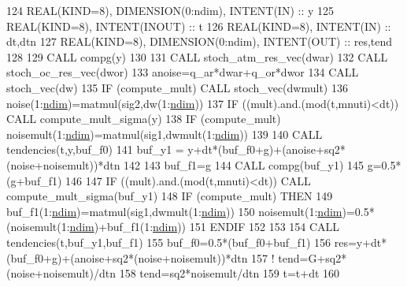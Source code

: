 \begin{DoxyCode}
124     \textcolor{keywordtype}{REAL(KIND=8)}, \textcolor{keywordtype}{DIMENSION(0:ndim)}, \textcolor{keywordtype}{INTENT(IN)} :: y
125     \textcolor{keywordtype}{REAL(KIND=8)}, \textcolor{keywordtype}{INTENT(INOUT)} :: t
126     \textcolor{keywordtype}{REAL(KIND=8)}, \textcolor{keywordtype}{INTENT(IN)} :: dt,dtn
127     \textcolor{keywordtype}{REAL(KIND=8)}, \textcolor{keywordtype}{DIMENSION(0:ndim)}, \textcolor{keywordtype}{INTENT(OUT)} :: res,tend
128 
129     \textcolor{keyword}{CALL }compg(y)
130     
131     \textcolor{keyword}{CALL }stoch\_atm\_res\_vec(dwar)
132     \textcolor{keyword}{CALL }stoch\_oc\_res\_vec(dwor)
133     anoise=q\_ar*dwar+q\_or*dwor
134     \textcolor{keyword}{CALL }stoch\_vec(dw)
135     \textcolor{keywordflow}{IF} (compute\_mult) \textcolor{keyword}{CALL }stoch\_vec(dwmult)
136     noise(1:\hyperlink{namespaceparams_a2323fe1773f086e20c14f266351c482b}{ndim})=matmul(sig2,dw(1:\hyperlink{namespaceparams_a2323fe1773f086e20c14f266351c482b}{ndim}))
137     \textcolor{keywordflow}{IF} ((mult).and.(mod(t,mnuti)<dt)) \textcolor{keyword}{CALL }compute\_mult\_sigma(y)
138     \textcolor{keywordflow}{IF} (compute\_mult) noisemult(1:\hyperlink{namespaceparams_a2323fe1773f086e20c14f266351c482b}{ndim})=matmul(sig1,dwmult(1:\hyperlink{namespaceparams_a2323fe1773f086e20c14f266351c482b}{ndim}))
139 
140     \textcolor{keyword}{CALL }tendencies(t,y,buf\_f0)
141     buf\_y1 = y+dt*(buf\_f0+g)+(anoise+sq2*(noise+noisemult))*dtn
142 
143     buf\_f1=g
144     \textcolor{keyword}{CALL }compg(buf\_y1)
145     g=0.5*(g+buf\_f1)
146     
147     \textcolor{keywordflow}{IF} ((mult).and.(mod(t,mnuti)<dt)) \textcolor{keyword}{CALL }compute\_mult\_sigma(buf\_y1)
148     \textcolor{keywordflow}{IF} (compute\_mult) \textcolor{keywordflow}{THEN}
149        buf\_f1(1:\hyperlink{namespaceparams_a2323fe1773f086e20c14f266351c482b}{ndim})=matmul(sig1,dwmult(1:\hyperlink{namespaceparams_a2323fe1773f086e20c14f266351c482b}{ndim}))
150        noisemult(1:\hyperlink{namespaceparams_a2323fe1773f086e20c14f266351c482b}{ndim})=0.5*(noisemult(1:\hyperlink{namespaceparams_a2323fe1773f086e20c14f266351c482b}{ndim})+buf\_f1(1:\hyperlink{namespaceparams_a2323fe1773f086e20c14f266351c482b}{ndim}))
151 \textcolor{keywordflow}{    ENDIF}
152 
153 
154     \textcolor{keyword}{CALL }tendencies(t,buf\_y1,buf\_f1)
155     buf\_f0=0.5*(buf\_f0+buf\_f1)
156     res=y+dt*(buf\_f0+g)+(anoise+sq2*(noise+noisemult))*dtn
157     \textcolor{comment}{! tend=G+sq2*(noise+noisemult)/dtn}
158     tend=sq2*noisemult/dtn
159     t=t+dt
160 
\end{DoxyCode}


